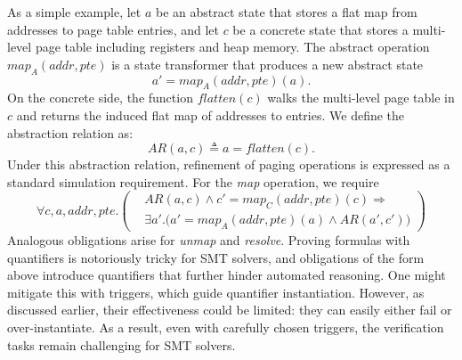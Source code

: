 As a simple example, let $a$ be an abstract state that stores a flat map from
addresses to page table entries, and let $c$ be a concrete state that stores a
multi-level page table including registers and heap memory. The abstract
operation $\textit{map}_A(\mathit{addr},\mathit{pte})$ is a state transformer
that produces a new abstract state
{
\small
\[
  a' = \textit{map}_A(\mathit{addr},\mathit{pte})(a).
\]
}
On the concrete side, the function $\mathit{flatten}(c)$ walks the multi-level
page table in $c$ and returns the induced flat map of addresses to entries. We
define the abstraction relation as: 
{
\small
\[
  AR(a,c) \triangleq a = \mathit{flatten}(c).
\]
}
Under this abstraction relation, refinement of paging operations is expressed as
a standard simulation requirement. For the \textit{map} operation, we require
{
\small
\[
\forall c,a,\mathit{addr},\mathit{pte}.
\left(
\begin{aligned}
   & AR(a,c)
     \land
     c' = \textit{map}_C(\mathit{addr},\mathit{pte})(c)
     \Rightarrow
   \\
   & \exists a'.
       \bigl(
         a' = \textit{map}_A(\mathit{addr},\mathit{pte})(a)
         \land
         AR(a',c')
       \bigr)
\end{aligned}
\right)
\]
}
Analogous obligations arise for \textit{unmap} and \textit{resolve}.
Proving formulas with quantifiers is notoriously tricky for SMT solvers, and obligations of the form above introduce quantifiers that further hinder automated reasoning. One might mitigate this with triggers, which guide quantifier instantiation. However, as discussed earlier, their effectiveness could be limited: they can easily either fail or over-instantiate. As a result, even with carefully chosen triggers, the verification tasks remain challenging for SMT solvers.

